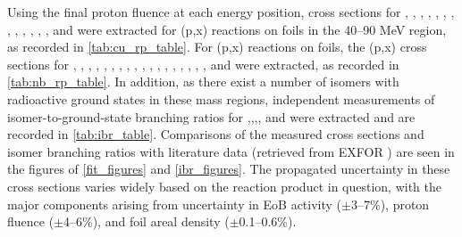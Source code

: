 Using the final proton fluence at each energy position, cross sections for  ,  , , , , , , ,  , , , , , and  were extracted for (p,x) reactions  on  foils in the 40--90 MeV region, as recorded in \autoref{tab:cu_rp_table}.
For  (p,x) reactions on  foils, the (p,x) cross sections for , , , , , , , , , , , , , , , , , , and  were extracted, as recorded in \autoref{tab:nb_rp_table}.
In addition, as there exist a number of isomers with radioactive ground states in these mass regions,  independent measurements of isomer-to-ground-state branching ratios for ,,,, and  were  extracted and are recorded in \autoref{tab:ibr_table}.
Comparisons  of the measured cross sections and isomer branching ratios with literature data (retrieved from EXFOR \cite{Otuka2014272}) are seen in the figures of \ref{fit_figures} and \ref{ibr_figures}.
The propagated uncertainty in these cross sections varies widely based on the reaction product in question, with the major components  arising from uncertainty in EoB activity ($\pm$3--7\%), proton fluence ($\pm$4--6\%), and foil areal density ($\pm$0.1--0.6\%).






